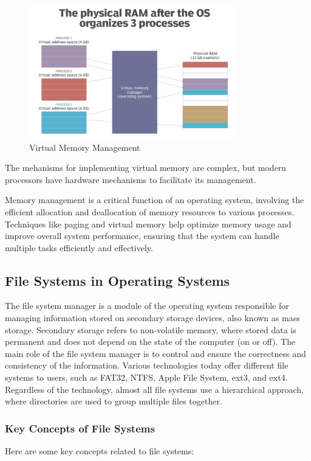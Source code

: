 \begin{figure}[h]
    \centering
    \includegraphics[width=0.8\textwidth]{images/memory.png}
    \caption{Virtual Memory Management}
    \label{fig:virtual_memory}
\end{figure}

The mehanisms for implementing virtual memory are complex, but modern processors have hardware mechanisms to facilitate its management.


Memory management is a critical function of an operating system, involving the efficient allocation and deallocation of memory resources to various processes. Techniques like paging and virtual memory help optimize memory usage and improve overall system performance, ensuring that the system can handle multiple tasks efficiently and effectively.

\subsection{File Systems in Operating Systems}
The file system manager is a module of the operating system responsible for managing information stored on secondary storage devices, also known as mass storage. Secondary storage refers to non-volatile memory, where stored data is permanent and does not depend on the state of the computer (on or off). The main role of the file system manager is to control and ensure the correctness and consistency of the information. Various technologies today offer different file systems to users, such as FAT32, NTFS, Apple File System, ext3, and ext4. Regardless of the technology, almost all file systems use a hierarchical approach, where directories are used to group multiple files together.

\subsubsection{Key Concepts of File Systems}
Here are some key concepts related to file systems:

